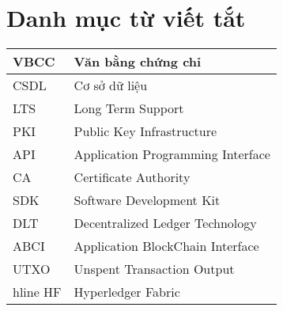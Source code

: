 \chapter*{Danh mục từ viết tắt}
\begin{center}
\renewcommand{\arraystretch}{1.5}
\begin{longtable}{ |l @{\qquad} |l| }
\hline
VBCC   & Văn bằng chứng chỉ  \\ \hline
CSDL   & Cơ sở dữ liệu  \\ \hline
LTS  &  Long Term Support  \\ \hline
PKI  &  Public Key Infrastructure \\ \hline
API    & Application Programming Interface  \\ \hline
CA    & Certificate Authority \\ \hline
SDK    & Software Development Kit \\ \hline
DLT & Decentralized Ledger Technology \\ \hline
ABCI & Application BlockChain Interface \\ \hline
UTXO & Unspent Transaction Output \\ hline 
HF & Hyperledger Fabric  \\ \hline

\end{longtable}
\end{center}
